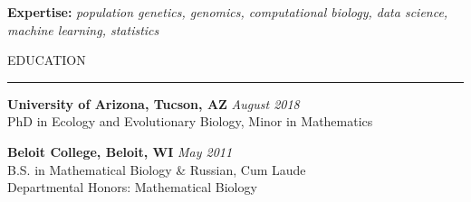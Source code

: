 \documentclass{resume} %
\renewenvironment{rSection}[1]{
\sectionskip
\textcolor{RoyalPurple}{\MakeUppercase{#1}}
\sectionlineskip
\hrule
\begin{list}{}{
\setlength{\leftmargin}{1.5em}
}
\item[]
}{
\end{list}
}
\begin{document}

\textcolor{RoyalPurple}{\bf Expertise:}
\textcolor{RoyalPurple}{\em population genetics, genomics, computational biology, data science, machine learning, statistics}

\begin{rSection}{Education}

{\bf University of Arizona, Tucson, AZ} \hfill {\em August 2018} \\ 
PhD in Ecology and Evolutionary Biology, Minor in Mathematics 

{\bf Beloit College, Beloit, WI} \hfill {\em May 2011} \\ 
B.S. in Mathematical Biology \& Russian, Cum Laude \\
Departmental Honors: Mathematical Biology

\end{rSection}

\end{document}
